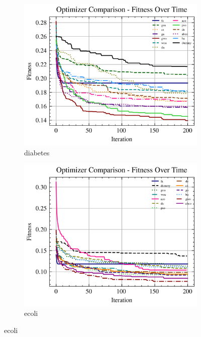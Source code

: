 \begin{figure}[htb]
    \begin{subfigure}[b]{0.45\textwidth}
        \includegraphics[width=\textwidth]{imagenes/fitness_charts/img/binary/diabetes/optimizers_fitness_svc.png}
        \caption{diabetes}
        \label{fig:convergencia_diabetes_svc}
    \end{subfigure}
    \begin{subfigure}[b]{0.45\textwidth}
        \includegraphics[width=\textwidth]{imagenes/fitness_charts/img/binary/ecoli/optimizers_fitness_svc.png}
        \caption{ecoli}
        \label{fig:convergencia_ecoli_svc}
    \end{subfigure}


\end{figure}
